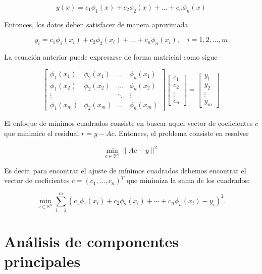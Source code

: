 \[
y(x)=c_{1} \phi_{1}(x)+c_{2} \phi_{2}(x)+\ldots+c_{n} \phi_{n}(x)
\]

Entonces, los datos deben satisfacer de manera aproximada

\[
y_{i}=c_{1} \phi_{1}\left(x_{i}\right)+c_{2} \phi_{2}\left(x_{i}\right)+\ldots+c_{n} \phi_{n}\left(x_{i}\right), \quad i=1,2, \ldots, m
\]

La ecuación anterior puede expresarse de forma matricial como sigue

\[
\left[\begin{array}{cccc}
	\phi_{1}\left(x_{1}\right) & \phi_{2}\left(x_{1}\right) & \ldots & \phi_{n}\left(x_{1}\right) \\
	\phi_{1}\left(x_{2}\right) & \phi_{2}\left(x_{2}\right) & \ldots & \phi_{n}\left(x_{2}\right) \\
	\vdots & & \ddots & \vdots \\
	\phi_{1}\left(x_{m}\right) & \phi_{2}\left(x_{m}\right) & \ldots & \phi_{n}\left(x_{m}\right)
\end{array}\right]\left[\begin{array}{c}
	c_{1} \\
	c_{2} \\
	\vdots \\
	c_{n}
\end{array}\right]=\left[\begin{array}{c}
	y_{1} \\
	y_{2} \\
	\vdots \\
	y_{m}
\end{array}\right]
\]

El enfoque de mínimos cuadrados consiste en buscar aquel vector de coeficientes $c$ que minimice el residual $r=y-Ac$. Entonces, el problema consiste en resolver 

\[
\min _{c \in \mathbb{R}^{n}}\|A c-y\|^{2}
\]

Es decir, para encontrar el ajuste de mínimos cuadrados debemos encontrar el vector de coeficientes $c=(c_1,...,c_n)^T$ que minimiza la suma de los cuadrados:

\[
\min _{c \in \mathbb{R}^{n}} \sum_{i=1}^{m}\left(c_{1} \phi_{1}\left(x_{i}\right)+c_{2} \phi_{2}\left(x_{i}\right)+\cdots+c_{n} \phi_{n}\left(x_{i}\right)-y_{i}\right)^{2}.
\]

\section{Análisis de componentes principales}

